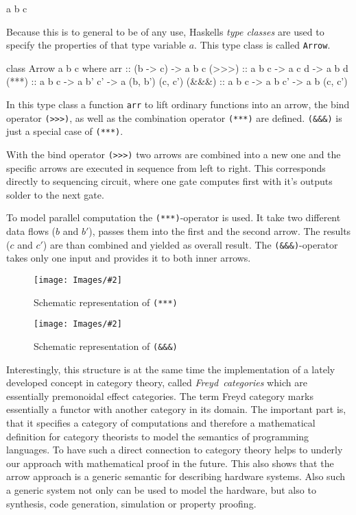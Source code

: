 \documentclass[9pt,final,a4paper,leqno]{article}
\newcommand{\grafik}[4][0.9]{%
    \begin{figure}[ht]%
        \begin{center}
            \texttt{[image: Images/\#2]}
            \caption{\label{#4} #3}
            
        \end{center}
    \end{figure}
}
\newcommand{\boxit}[1]{\mbox{{\it #1}}}
\newcommand{\hs}[1]{\mbox{\lstinline[basicstyle=\color{textgray}]!#1!}}
\begin{document}
\begin{center}
\begin{minipage}{.2\textwidth}
\begin{haskell}
a b c
\end{haskell}
\end{minipage} \end{center}

Because this is to general to be of any use, Haskells \emph{type classes} are used to specify the properties of that type variable $a$. This
type class is called \hs{Arrow}. 

\begin{haskell}
class Arrow a b c where 
  arr   :: (b -> c) -> a b c
  (>>>)  :: a b c    -> a c d   -> a b d
  (***) :: a b c    -> a b' c' -> a (b, b') (c, c')
  (&&&) :: a b c    -> a b  c' -> a  b      (c, c')
\end{haskell}

In this type class a function \hs{arr} to lift ordinary functions into an arrow, the bind operator \hs{(>>>)}, as well as the combination
operator \hs{(***)} are defined. \hs{(&&&)} is just a special case of \hs{(***)}. 

\par
With the bind operator \hs{(>>>)} two arrows are combined into a new one and the specific arrows are executed in sequence from left to
right. This corresponds directly to sequencing circuit, where one gate computes first with it's outputs solder to the next gate. 

\par 
To model parallel computation the \hs{(***)}-operator is used. It take two different data flows ($b$ and $b'$), passes them into the first
and the second arrow. The results ($c$ and $c'$) are than combined and yielded as overall result. The \hs{(&&&)}-operator takes only one
input and provides it to both inner arrows.

\grafik[.6]{ArrowStarStarStar}{Schematic representation of \hs{(***)}}{figure:ststst}
\grafik[.6]{ArrowAndAndAnd}{Schematic representation of \hs{(&&&)}}{figure:ananan}

\par
Interestingly, this structure is at the same time the implementation of a lately developed concept in category theory, called \boxit{Freyd
categories} which are essentially premonoidal effect categories\cite{Heunen06arrows, Hughes98generalisingmonads,PatersonRA}. The term Freyd
category marks essentially a functor with another category in its domain. The important part is, that it specifies a category of
computations and therefore a mathematical definition for category theorists to model the semantics of programming languages. To have such a
direct connection to category theory helps to underly our approach with mathematical proof in the future. This also shows that the arrow
approach is a generic semantic for describing hardware systems. Also such a generic system not only can be used to model the hardware, but
also to synthesis, code generation, simulation or property proofing. 
\end{document}
